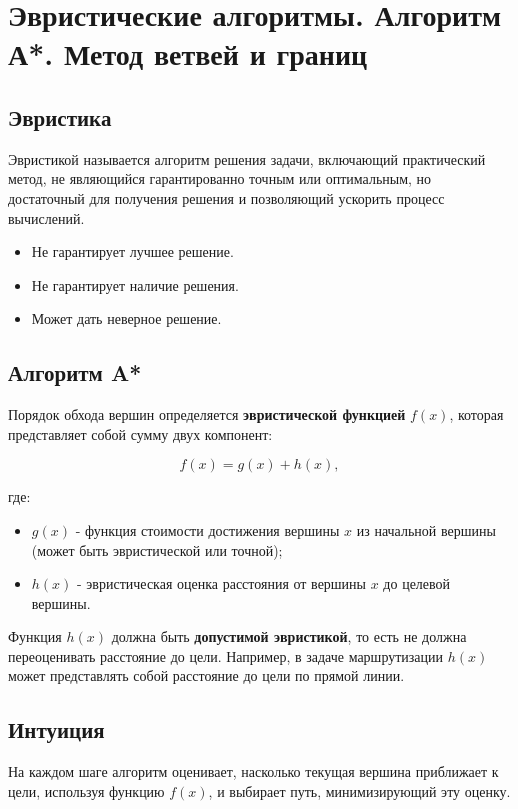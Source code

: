 {
	\section{Эвристические алгоритмы. Алгоритм А*. Метод ветвей и границ}

\subsection*{Эвристика}
Эвристикой называется алгоритм решения задачи, включающий практический метод, не являющийся гарантированно точным или оптимальным, но достаточный для получения решения и позволяющий ускорить процесс вычислений.

\begin{itemize}
  \item Не гарантирует лучшее решение.
  \item Не гарантирует наличие решения.
  \item Может дать неверное решение.
\end{itemize}

\subsection*{Алгоритм A*}

Порядок обхода вершин определяется \textbf{эвристической функцией} $f(x)$, которая представляет собой сумму двух компонент:


\[
f(x) = g(x) + h(x),
\]


где:
\begin{itemize}
  \item $g(x)$ - функция стоимости достижения вершины $x$ из начальной вершины (может быть эвристической или точной);
  \item $h(x)$ - эвристическая оценка расстояния от вершины $x$ до целевой вершины.
\end{itemize}

Функция $h(x)$ должна быть \textbf{допустимой эвристикой}, то есть не должна переоценивать расстояние до цели.  
Например, в задаче маршрутизации $h(x)$ может представлять собой расстояние до цели по прямой линии.

\subsection*{Интуиция}
На каждом шаге алгоритм оценивает, насколько текущая вершина приближает к цели, используя функцию $f(x)$, и выбирает путь, минимизирующий эту оценку.

}
